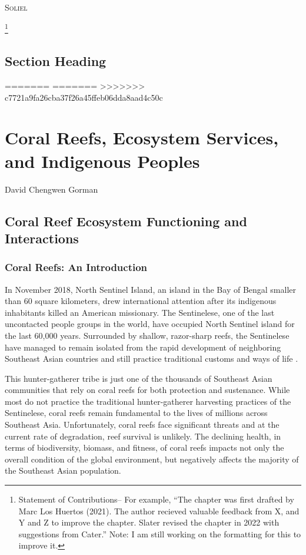 \documentclass{book}\usepackage{knitr}
\makeatletter
\newcommand{\chapterauthor}[1]{%
  {\parindent0pt\vspace*{-25pt}%
  \linespread{1.1}\large\scshape#1%
  \par\nobreak\vspace*{35pt}}
  \@afterheading%
}
\makeatother
\begin{document}
\begin{knitrout}
\begin{kframe}
\chapterauthor{Soliel}

\footnote{Statement of Contributions-- For example, ``The chapter was first drafted by Marc Los Huertos (2021). The author recieved valuable feedback from X, and Y and Z to improve the chapter. Slater revised the chapter in 2022 with suggestions from Cater.'' Note: I am still working on the formatting for this to improve it.}

\section{Section Heading}%

=======
=======
>>>>>>> c7721a9fa26cba37f26a45ffeb06dda8aad4c50c
\chapter{Coral Reefs, Ecosystem Services, and Indigenous Peoples}

David Chengwen Gorman

\section{Coral Reef Ecosystem Functioning and Interactions}

\subsection{Coral Reefs: An Introduction}

In November 2018, North Sentinel Island, an island in the Bay of Bengal smaller than 60 square kilometers, drew international attention after its indigenous inhabitants killed an American missionary.  The Sentinelese, one of the last uncontacted people groups in the world, have occupied North Sentinel island for the last 60,000 years. Surrounded by shallow, razor-sharp reefs, the Sentinelese have managed to remain isolated from the rapid development of neighboring Southeast Asian countries and still practice traditional customs and ways of life \citep{Smith}.

This hunter-gatherer tribe is just one of the thousands of Southeast Asian communities that rely on coral reefs for both protection and sustenance. While most do not practice the traditional hunter-gatherer harvesting practices of the Sentinelese, coral reefs remain fundamental to the lives of millions across Southeast Asia. Unfortunately, coral reefs face significant threats and at the current rate of degradation, reef survival is unlikely. The declining health, in terms of biodiversity, biomass, and fitness, of coral reefs impacts not only the overall condition of the global environment, but negatively affects the majority of the Southeast Asian population.


\end{kframe}
\end{knitrout}
\end{document}

